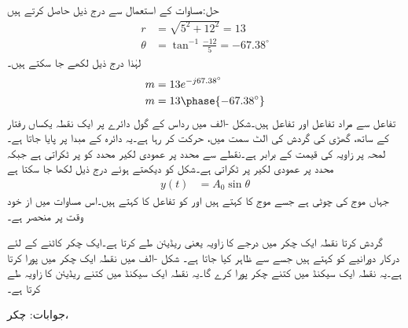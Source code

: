 حل:مساوات  کے استعمال سے درج ذیل حاصل کرتے ہیں
\begin{align*}
r&=\sqrt{5^2+12^2}=13\\
\theta&=\tan^{-1}\frac{-12}{5}=-67.38^{\circ}
\end{align*}
لہٰذا درج ذیل لکھے جا سکتے ہیں۔
\begin{align*}
m&=13 e^{-j67.38^{\circ}}\\
m&=13\phase{-67.38^{\circ}}
\end{align*}
 تفاعل سے مراد  تفاعل  اور  تفاعل  ہیں۔شکل -الف میں رداس  کے گول دائرے پر ایک نقطہ یکساں رفتار کے ساتھ، گھڑی کی گردش کی الٹ سمت میں، حرکت کر رہا ہے۔یہ دائرہ  کے مبدا  پر پایا جاتا ہے۔لمحہ  پر زاویہ  کی قیمت  کے برابر ہے۔نقطے سے  محدد پر عمودی لکیر محدد کو    پر ٹکراتی ہے جبکہ  محدد پر عمودی لکیر  پر ٹکراتی ہے۔شکل کو دیکھتے ہوئے درج ذیل لکھا جا سکتا ہے
\begin{align}\label{مساوات_بدلتا_سائن_نما_تفاعل_الف}
y(t)&=A_0 \sin \theta
\end{align}
جہاں  موج کی چوٹی ہے جسے موج کا  کہتے ہیں اور  کو تفاعل کا  کہتے ہیں۔اس مساوات میں  از خود وقت پر منحصر ہے۔

 گردش کرتا نقطہ ایک چکر میں  درجے کا زاویہ یعنی  ریڈیئن طے کرتا ہے۔ایک چکر کاٹنے کے لئے درکار دورانیے کو  کہتے ہیں جسے  سے ظاہر کیا جاتا ہے۔
شکل -الف میں نقطہ ایک چکر  میں پورا کرتا ہے۔یہ نقطہ ایک سیکنڈ میں کتنے چکر پورا کرے گا۔یہ نقطہ ایک سیکنڈ میں کتنے ریڈیئن کا زاویہ طے کرتا ہے۔

جوابات: چکر، 

